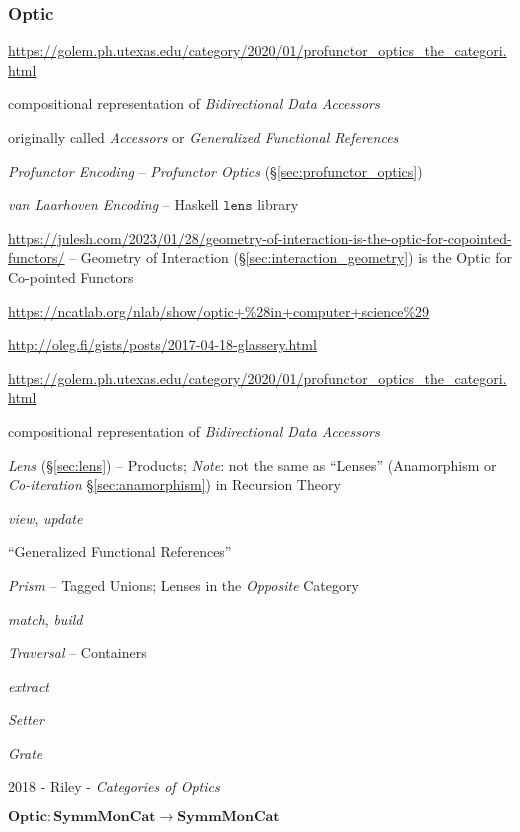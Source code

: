 \subsubsection{Optic}\label{sec:optic}


\url{https://golem.ph.utexas.edu/category/2020/01/profunctor_optics_the_categori.html}

compositional representation of \emph{Bidirectional Data Accessors}

originally called \emph{Accessors} or \emph{Generalized Functional References}

\emph{Profunctor Encoding} -- \emph{Profunctor Optics}
(\S\ref{sec:profunctor_optics})

\emph{van Laarhoven Encoding} -- Haskell $\mathtt{lens}$ library


\url{https://julesh.com/2023/01/28/geometry-of-interaction-is-the-optic-for-copointed-functors/}
-- Geometry of Interaction (\S\ref{sec:interaction_geometry}) is the Optic for
Co-pointed Functors

\url{https://ncatlab.org/nlab/show/optic+%28in+computer+science%29}

\url{http://oleg.fi/gists/posts/2017-04-18-glassery.html}

\url{https://golem.ph.utexas.edu/category/2020/01/profunctor_optics_the_categori.html}

compositional representation of \emph{Bidirectional Data Accessors}

\emph{Lens} (\S\ref{sec:lens}) -- Products; \emph{Note}: not the same as
``Lenses'' (Anamorphism or \emph{Co-iteration} \S\ref{sec:anamorphism}) in
Recursion Theory

\emph{view}, \emph{update}

``Generalized Functional References''

\emph{Prism} -- Tagged Unions; Lenses in the \emph{Opposite} Category

\emph{match}, \emph{build}

\emph{Traversal} -- Containers

\emph{extract}

\emph{Setter}

\emph{Grate}

2018 - Riley - \emph{Categories of Optics}

$\mathbf{Optic} : \mathbf{SymmMonCat} \rightarrow \mathbf{SymmMonCat}$

